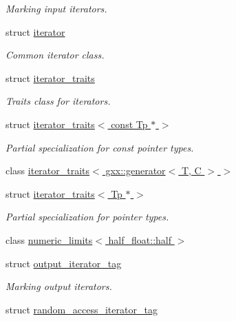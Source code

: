 \begin{DoxyCompactItemize}
\begin{DoxyCompactList}\small\item\em Marking input iterators. \end{DoxyCompactList}\item 
struct \hyperlink{structstd_1_1iterator}{iterator}
\begin{DoxyCompactList}\small\item\em Common iterator class. \end{DoxyCompactList}\item 
struct \hyperlink{structstd_1_1iterator__traits}{iterator\+\_\+traits}
\begin{DoxyCompactList}\small\item\em Traits class for iterators. \end{DoxyCompactList}\item 
struct \hyperlink{structstd_1_1iterator__traits_3_01const_01Tp_01_5_01_4}{iterator\+\_\+traits$<$ const Tp $\ast$ $>$}
\begin{DoxyCompactList}\small\item\em Partial specialization for const pointer types. \end{DoxyCompactList}\item 
class \hyperlink{classstd_1_1iterator__traits_3_01gxx_1_1generator_3_01T_00_01C_01_4_01_4}{iterator\+\_\+traits$<$ gxx\+::generator$<$ T, C $>$ $>$}
\item 
struct \hyperlink{structstd_1_1iterator__traits_3_01Tp_01_5_01_4}{iterator\+\_\+traits$<$ Tp $\ast$ $>$}
\begin{DoxyCompactList}\small\item\em Partial specialization for pointer types. \end{DoxyCompactList}\item 
class \hyperlink{classstd_1_1numeric__limits_3_01half__float_1_1half_01_4}{numeric\+\_\+limits$<$ half\+\_\+float\+::half $>$}
\item 
struct \hyperlink{structstd_1_1output__iterator__tag}{output\+\_\+iterator\+\_\+tag}
\begin{DoxyCompactList}\small\item\em Marking output iterators. \end{DoxyCompactList}\item 
struct \hyperlink{structstd_1_1random__access__iterator__tag}{random\+\_\+access\+\_\+iterator\+\_\+tag}
\end{DoxyCompactItemize}
